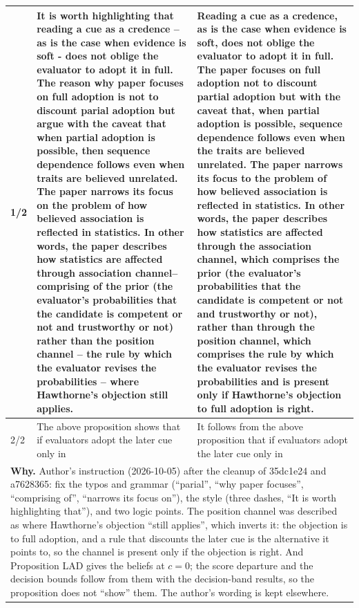 \documentclass[10pt]{article}
\theoremstyle{definition}
\newlength{\fullw}\setlength{\fullw}{25.9cm}
\begin{document}
{\begin{longtable}{|p{0.9cm}|p{12.2cm}|p{12.2cm}|}
1/2 & It is worth highlighting that reading a cue as a credence -- as is the case when evidence is soft - does not oblige the evaluator to adopt it in full. The reason why paper focuses on full adoption is not to discount parial adoption but argue with the caveat that when partial adoption is possible, then sequence dependence follows even when traits are believed unrelated. The paper narrows its focus on the problem of how believed association is reflected in statistics. In other words, the paper describes how statistics are affected through association channel-- comprising of the prior (the evaluator's probabilities that the candidate is competent or not and trustworthy or not) rather than the position channel -- the rule by which the evaluator revises the probabilities -- where Hawthorne's objection still applies. & Reading a cue as a credence, as is the case when evidence is soft, does not oblige the evaluator to adopt it in full. The paper focuses on full adoption not to discount partial adoption but with the caveat that, when partial adoption is possible, sequence dependence follows even when the traits are believed unrelated. The paper narrows its focus to the problem of how believed association is reflected in statistics. In other words, the paper describes how statistics are affected through the association channel, which comprises the prior (the evaluator's probabilities that the candidate is competent or not and trustworthy or not), rather than through the position channel, which comprises the rule by which the evaluator revises the probabilities and is present only if Hawthorne's objection to full adoption is right. \\ \hline
2/2 & The above proposition shows that if evaluators adopt the later cue only in & It follows from the above proposition that if evaluators adopt the later cue only in \\ \hline
\multicolumn{3}{|p{\fullw}|}{\textbf{Why.} Author's instruction (2026-10-05) after the cleanup of 35dc1e24 and a7628365: fix the typos and grammar (``parial'', ``why paper focuses'', ``comprising of'', ``narrows its focus on''), the style (three dashes, ``It is worth highlighting that''), and two logic points. The position channel was described as where Hawthorne's objection ``still applies'', which inverts it: the objection is to full adoption, and a rule that discounts the later cue is the alternative it points to, so the channel is present only if the objection is right. And Proposition LAD gives the beliefs at $c=0$; the score departure and the decision bounds follow from them with the decision-band results, so the proposition does not ``show'' them. The author's wording is kept elsewhere.} \\

\end{longtable}}
\end{document}
